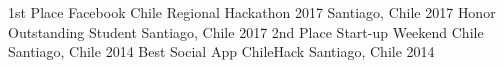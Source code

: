 \begin{cvhonors}
  \cvhonor
    {1st Place}
    {Facebook Chile Regional Hackathon 2017}
    {Santiago, Chile}
    {2017}
  \cvhonor
    {Honor}
    {Outstanding Student}
    {Santiago, Chile}
    {2017}
  \cvhonor
    {2nd Place}
    {Start-up Weekend Chile}
    {Santiago, Chile}
    {2014}
  \cvhonor
    {Best Social App}
    {ChileHack}
    {Santiago, Chile}
    {2014}
\end{cvhonors}
